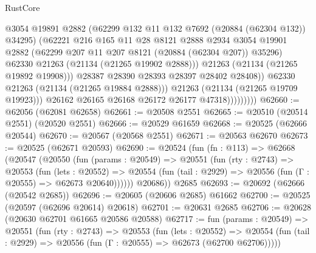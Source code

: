 \begin{lexlean}{RustCore}
\begin{coremodule}
                                @3054
                                @19891
                                @2882
                                (@62299 @132 @11 @132 @7692 (@20884 (@62304 @132)) @34295)
                                (@62221
                                  @216
                                  @165
                                  @11
                                  @28
                                  @8121
                                  @2888
                                  @2934
                                  @3054
                                  @19901
                                  @2882
                                  (@62299 @207 @11 @207 @8121 (@20884 (@62304 @207)) @35296)
                                  @62330
                                  @21263
                                  (@21134 (@21265 @19902 @2888)))
                                @21263
                                (@21134 (@21265 @19892 @19908)))
                              @28387
                              @28390
                              @28393
                              @28397
                              @28402
                              @28408))
                          @62330
                          @21263
                          (@21134 (@21265 @19884 @2888)))
                        @21263
                        (@21134 (@21265 @19709 @19923)))
                      @26162
                      @26165
                      @26168
                      @26172
                      @26177
                      @47318)))))))))
@62660 := @62056 (@62081 @62658)
@62661 := @20508 @2551
@62665 := @20510 (@20514 @2551) (@20520 @2551)
@62666 := @20529 @61659
@62668 := @20525 (@62666 @20544)
@62670 := @20567 (@20568 @2551)
@62671 := @20563 @62670
@62673 := @20525 (@62671 @20593)
@62690 := @20524
    (fun (fn : @113) =>
    @62668
      (@20547
        (@20550
          (fun (params : @20549) =>
          @20551
            (fun (rty : @2743) =>
            @20553
              (fun (lets : @20552) =>
              @20554 (fun (tail : @2929) => @20556 (fun (Γ : @20555) => @62673 @20640))))))
        @20686))
    @2685
@62693 := @20692 (@62666 (@20542 @2685))
@62696 := @20605 (@20606 @2685) @61662
@62700 := @20525 (@20597 (@62696 @20614) @20618)
@62701 := @20631 @2685
@62706 := @20628 (@20630 @62701 @61665 @20586 @20588)
@62717 := fun (params : @20549) =>
  @20551
    (fun (rty : @2743) =>
    @20553
      (fun (lets : @20552) =>
      @20554 (fun (tail : @2929) => @20556 (fun (Γ : @20555) => @62673 (@62700 @62706)))))

\end{coremodule}
\end{lexlean}
